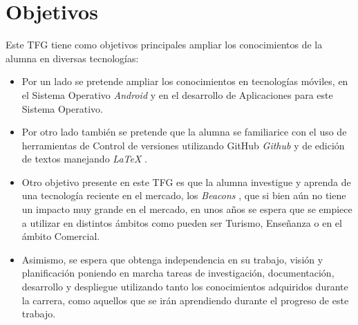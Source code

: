 %
%
%
%


\chapter{Objetivos} \label{chap:Objetivos}  

Este TFG tiene como objetivos principales ampliar los conocimientos de la alumna en diversas tecnologías:

	
\begin{itemize}
\item  	Por un lado se pretende ampliar los conocimientos en tecnologías móviles, en el Sistema Operativo \textit{Android} \cite{URL::Android} y en el desarrollo de Aplicaciones para este Sistema Operativo.
\item Por otro lado también se pretende que la alumna se familiarice con el uso de herramientas de Control de versiones utilizando GitHub \textit{Github} \cite{URL::Github} y de edición de textos manejando \textit{LaTeX}  \cite{URL::LaTeX}.
\item Otro objetivo presente en este TFG es que la alumna investigue y aprenda de una tecnología reciente en el mercado, los \textit{Beacons} \cite{URL::Beacon} , que si bien aún no tiene un impacto muy grande en el mercado, en unos años se espera que se empiece a utilizar en distintos ámbitos como pueden ser Turismo, Enseñanza o en el ámbito Comercial.
\item  Asimismo, se espera que obtenga independencia en su trabajo, visión y planificación poniendo en marcha tareas de investigación, documentación, desarrollo y despliegue utilizando tanto los conocimientos adquiridos durante la carrera, como aquellos que se irán aprendiendo durante el progreso de este trabajo.
\end{itemize}